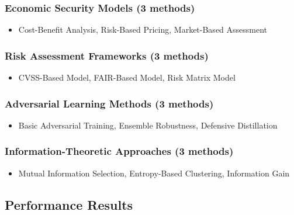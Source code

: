 \documentclass[journal]{IEEEtran}
\begin{document}
\subsubsection{Economic Security Models (3 methods)}
\begin{itemize}
\item Cost-Benefit Analysis, Risk-Based Pricing, Market-Based Assessment
\end{itemize}

\subsubsection{Risk Assessment Frameworks (3 methods)}
\begin{itemize}
\item CVSS-Based Model, FAIR-Based Model, Risk Matrix Model
\end{itemize}

\subsubsection{Adversarial Learning Methods (3 methods)}
\begin{itemize}
\item Basic Adversarial Training, Ensemble Robustness, Defensive Distillation
\end{itemize}

\subsubsection{Information-Theoretic Approaches (3 methods)}
\begin{itemize}
\item Mutual Information Selection, Entropy-Based Clustering, Information Gain
\end{itemize}

\subsection{Performance Results}
\end{document}
